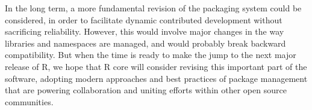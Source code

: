 In the long term, a more fundamental revision of the packaging system could be
considered, in order to facilitate dynamic contributed development without
sacrificing reliability. However, this would involve major changes in the way
libraries and namespaces are managed, and would probably break backward
compatibility. But when the time is ready to make the jump to the next major 
release of R, we hope that R core will consider revising this important
part of the software, adopting modern approaches and best practices of package
management that are powering collaboration and uniting efforts within other open
source communities.




\address{Jeroen Ooms\\
  Department of Statistics\\
  University of California\\
  Los Angeles}\\

